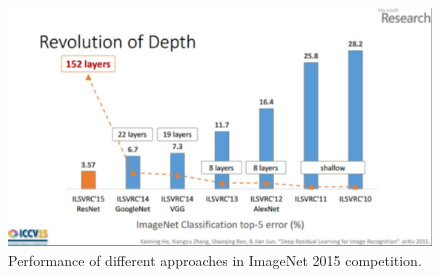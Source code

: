 \documentclass[10pt,twocolumn,letterpaper]{article}
\begin{document}
\begin{figure}
	\begin{center}
		\includegraphics[width=1.0\linewidth]{resnet_imagenet}
	\end{center}
	\caption{Performance of different approaches in ImageNet 2015 competition.}
	\label{fig:imagenet}
\end{figure}
\end{document}
